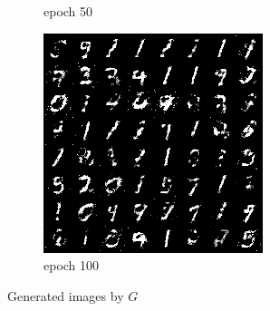 \documentclass[a4paper]{article}
\theoremstyle{definition}
\begin{document}
\begin{enumerate} [label=(\alph*)]
\begin{figure}[H]
\begin{subfigure}[b]{0.3\textwidth}
				\caption{epoch 50}
			\end{subfigure}
			\hfill
			\begin{subfigure}[b]{0.3\textwidth}
				\centering
				\includegraphics[width=\textwidth]{Images/Base/gan_q1_epoch100.png}
				\caption{epoch 100}
			\end{subfigure}
			\caption{Generated images by $G$}
			\label{fig:three graphs}
		\end{figure}
		

\end{enumerate}
\end{document}
